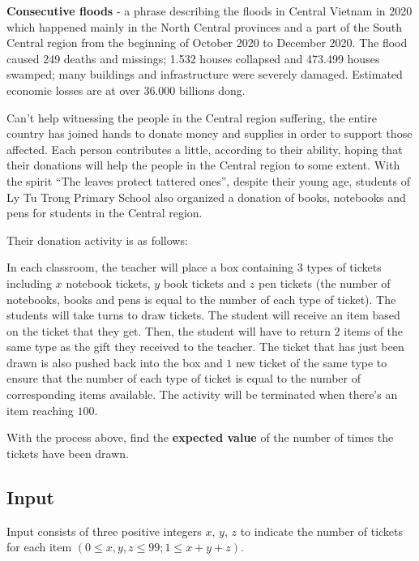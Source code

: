 \documentclass[12pt]{article}
\begin{document}
	\textbf{Consecutive floods} - a phrase describing the floods in Central Vietnam in 2020 which happened mainly in the North Central provinces and a part of the South Central region from the beginning of October 2020 to December 2020. The flood caused 249 deaths and missings; 1.532 houses collapsed and 473.499 houses swamped; many buildings and infrastructure were severely damaged. Estimated economic losses are at over 36.000 billions dong. 
	
	Can’t help witnessing the people in the Central region suffering, the entire country has joined hands to donate money and supplies in order to support those affected. Each person contributes a little, according to their ability, hoping that their donations will help the people in the Central region to some extent. With the spirit “The leaves protect tattered ones”, despite their young age, students of Ly Tu Trong Primary School also organized a donation of books, notebooks and pens for students in the Central region. 
	
	Their donation activity is as follows: 
	
	In each classroom, the teacher will place a box containing $3$ types of tickets including $x$ notebook tickets, $y$ book tickets and $z$ pen tickets (the number of notebooks, books and pens is equal to the number of each type of ticket). The students will take turns to draw tickets. 
	The student will receive an item based on the ticket that they get. Then, the student will have to return $2$ items of the same type as the gift they received to the teacher. The ticket that has just been drawn is also pushed back into the box and $1$ new ticket of the same type to ensure that the number of each type of ticket is equal to the number of corresponding items available. The activity will be terminated when there’s an item reaching $100$.
	
	With the process above, find the \textbf{expected value} of the number of times the tickets have been drawn. 

	\subsection*{Input}
	
	Input consists of three positive integers $x$, $y$, $z$ to indicate the number of tickets for each item $(0 \le x,y,z \le 99; 1 \le x+y+z)$. 
	
\end{document}

